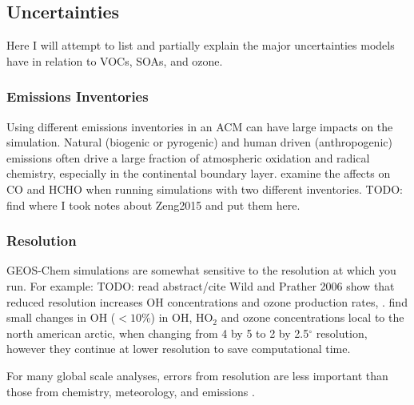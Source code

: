   \subsection{Uncertainties}
    \label{LR:Models:Unc}
    Here I will attempt to list and partially explain the major uncertainties models have in relation to  VOCs, SOAs, and ozone. 
    
    \subsubsection{Emissions Inventories}
      Using different emissions inventories in an ACM can have large impacts on the simulation.
      Natural (biogenic or pyrogenic) and human driven (anthropogenic) emissions often drive a large fraction of atmospheric oxidation and radical chemistry, especially in the continental boundary layer.
      \cite{Zeng2015} examine the affects on CO and HCHO when running simulations with two different inventories.
      TODO: find where I took notes about Zeng2015 and put them here.
    
    \subsubsection{Resolution}
      \label{LR:Models:Unc:Resolution}
      GEOS-Chem simulations are somewhat sensitive to the resolution at which you run.
      For example: TODO: read abstract/cite Wild and Prather 2006 show that reduced resolution increases OH concentrations and ozone production rates, \citep{Wild2006}.
      \cite{Christian2017} find small changes in OH ($<10$\%) in OH, HO$_2$ and ozone concentrations local to the north american arctic, when changing from 4 by 5 to 2 by 2.5$^{\circ}$ resolution, however they continue at lower resolution to save computational time.
      
      For many global scale analyses, errors from resolution are less important than those from chemistry, meteorology, and emissions \citep{Christian2017}.
      
      
      
    
